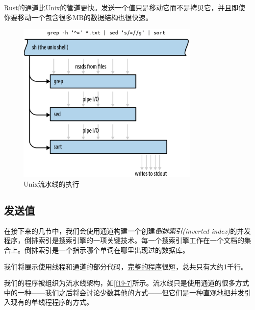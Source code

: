 Rust的通道比Unix的管道更快。发送一个值只是移动它而不是拷贝它，并且即使你要移动一个包含很多MB的数据结构也很快速。

\begin{figure}[htbp]
    \centering
    \includegraphics[width=0.8\textwidth]{../img/f19-6.png}
    \caption{Unix流水线的执行}
    \label{f19-6}
\end{figure}

\subsection{发送值}
在接下来的几节中，我们会使用通道构建一个创建\emph{倒排索引(inverted index)}的并发程序，倒排索引是搜索引擎的一项关键技术。每一个搜索引擎工作在一个文档的集合上。倒排索引是一个指示哪个单词在哪里出现过的数据库。

我们将展示使用线程和通道的部分代码，\href{https://github.com/ProgrammingRust/fingertips}{完整的程序}很短，总共只有大约1千行。

我们的程序被组织为流水线架构，如\autoref{f19-7}所示。流水线只是使用通道的很多方式中的一种——我们之后将会讨论少数其他的方式——但它们是一种直观地把并发引入现有的单线程程序的方式。

